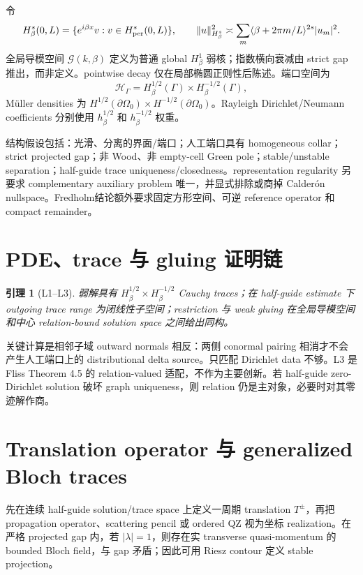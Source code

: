 \documentclass[UTF8,11pt,fontset=none]{ctexart}
\newtheorem{lemma}[theorem]{引理}
\theoremstyle{definition}
\newcommand{\G}{\mathcal G(k,\beta)}
\begin{document}
令
\[
H^s_\beta(0,L)=\{e^{i\beta x}v:v\in H^s_{\rm per}(0,L)\},\qquad
\|u\|_{H^s_\beta}^2\asymp\sum_m\langle\beta+2\pi m/L\rangle^{2s}|u_m|^2.
\]
全局导模空间 $\G$ 定义为普通 global $H^1_\beta$ 弱核；指数横向衰减由 strict gap 推出，而非定义。pointwise decay 仅在局部椭圆正则性后陈述。端口空间为
\[
\mathcal H_\Gamma=H^{1/2}_\beta(\Gamma)\times H^{-1/2}_\beta(\Gamma),
\]
Müller densities 为 $H^{1/2}(\partial\Omega_0)\times H^{-1/2}(\partial\Omega_0)$。Rayleigh Dirichlet/Neumann coefficients 分别使用 $h^{1/2}_\beta$ 和 $h^{-1/2}_\beta$ 权重。

结构假设包括：光滑、分离的界面/端口；人工端口具有 homogeneous collar；strict projected gap；非 Wood、非 empty-cell Green pole；stable/unstable separation；half-guide trace uniqueness/closedness。representation regularity 另要求 complementary auxiliary problem 唯一，并显式排除或商掉 Calderón nullspace。Fredholm结论额外要求固定方形空间、可逆 reference operator 和 compact remainder。

\section{PDE、trace 与 gluing 证明链}

\begin{lemma}[L1--L3]
弱解具有 $H^{1/2}_\beta\times H^{-1/2}_\beta$ Cauchy traces；在 half-guide estimate 下 outgoing trace range 为闭线性子空间；restriction 与 weak gluing 在全局导模空间和中心 relation-bound solution space 之间给出同构。
\end{lemma}

关键计算是相邻子域 outward normals 相反：两侧 conormal pairing 相消才不会产生人工端口上的 distributional delta source。只匹配 Dirichlet data 不够。L3 是 Fliss Theorem 4.5 的 relation-valued 适配，不作为主要创新。若 half-guide zero-Dirichlet solution 破坏 graph uniqueness，则 relation 仍是主对象，必要时对其零迹解作商。

\section{Translation operator 与 generalized Bloch traces}

先在连续 half-guide solution/trace space 上定义一周期 translation $T^\pm$，再把 propagation operator、scattering pencil 或 ordered QZ 视为坐标 realization。在严格 projected gap 内，若 $|\lambda|=1$，则存在实 transverse quasi-momentum 的 bounded Bloch field，与 gap 矛盾；因此可用 Riesz contour 定义 stable projection。
\end{document}
